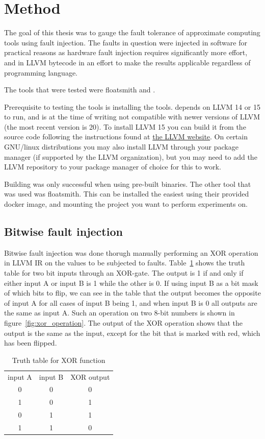 \section{Method}

The goal of this thesis was to gauge the fault tolerance of approximate computing tools using fault injection. The faults in question were injected in software for practical reasons as hardware fault injection requires significantly more effort, and in LLVM bytecode in an effort to make the results applicable regardless of programming language.

The tools that were tested were floatsmith and \taffo{}.

Prerequisite to testing the tools is installing the tools. \taffo{} depends on LLVM 14 or 15 to run, and is at the time of writing not compatible with newer versions of LLVM (the most recent version is 20). To install LLVM 15 you can build it from the source code following the instructions found at \href{llvm.org}{the LLVM website}. On certain GNU/linux distributions you may also install LLVM through your package manager (if supported by the LLVM organization), but you may need to add the LLVM repository  to your package manager of choice for this to work. 

Building \taffo{} was only successful when using pre-built binaries. 
The other tool that was used was floatsmith. This can be installed the easiest using their provided docker image, and mounting the project you want to perform experiments on.

\subsection{Bitwise fault injection}
Bitwise fault injection was done thorugh manually performing an XOR operation in LLVM IR on the values to be subjected to faults. Table~\ref{table:xor_truth_table} shows the truth table for two bit inputs through an XOR-gate. The output is 1 if and only if either input A or input B is 1 while the other is 0. If using input B as a bit mask of which bits to flip, we can see in the table that the output becomes the opposite of input A for all cases of input B being 1, and when input B is 0 all outputs are the same as input A. Such an operation on two 8-bit numbers is shown in figure~\ref{fig:xor_operation}. The output of the XOR operation shows that the output is the same as the input, except for the bit that is marked with red, which has been flipped.

\begin{table}[htb]
    \centering
\caption{Truth table for XOR function}
    \label{table:xor_truth_table}
\begin{tabular}{c|c|c}\label{table:xor_truth_table}
     input A& input B& XOR output \\
     0&0&0\\
     1&0&1\\
     0&1&1\\
     1&1&0
\end{tabular}
    
\end{table}



